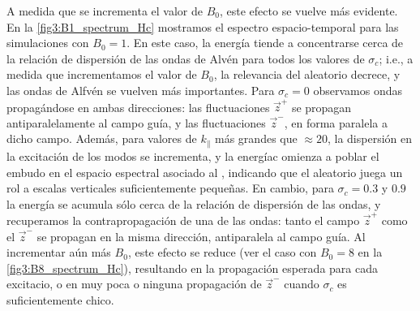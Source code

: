 A medida que se incrementa el valor de $B_0$, este efecto se vuelve
más evidente. En la \cref{fig3:B1_spectrum_Hc} mostramos el espectro
espacio-temporal para las simulaciones con $B_0=1$. En este caso, la
energía tiende a concentrarse cerca de la relación de dispersión de
las ondas de Alvén para todos los valores de $\sigma_c$; i.e., a
medida que incrementamos el valor de $B_0$, la relevancia del
\sweeping aleatorio decrece, y las ondas de Alfvén se vuelven más
importantes. Para $\sigma_c=0$ observamos ondas propagándose en ambas
direcciones: las fluctuaciones $\vec{z}^+$ se propagan
antiparalelamente al campo guía, y las fluctuaciones $\vec{z}^-$, en
forma paralela a dicho campo. Además, para valores de $k_\parallel$
más grandes que $\approx 20$, la dispersión en la excitación de los
modos se incrementa, y la energíac omienza a poblar el embudo en el
espacio espectral asociado al \sweeping, indicando que el \sweeping
aleatorio juega un rol a escalas verticales suficientemente
pequeñas. En cambio, para $\sigma_c =0.3$ y $0.9$ la energía se
acumula sólo cerca de la relación de dispersión de las ondas, y
recuperamos la contrapropagación de una de las ondas: tanto el campo
$\vec{z}^+$ como el $\vec{z}^-$ se propagan en la misma dirección,
antiparalela al campo guía. Al incrementar aún más $B_0$, este efecto
se reduce (ver el caso con $B_0=8$ en la \cref{fig3:B8_spectrum_Hc}),
resultando en la propagación esperada para cada excitacio, o en muy
poca o ninguna propagación de $\vec{z}^-$ cuando $\sigma_c$ es
suficientemente chico.

